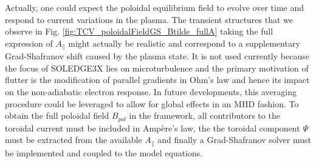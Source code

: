 Actually, one could expect the poloidal equilibrium field to evolve over time and respond to current variations in the plasma. The transient structures that we observe in Fig. \ref{fig:TCV_poloidalFieldGS_Btilde_fullA} taking the full expression of $A_\parallel$ might actually be realistic and correspond to a supplementary Grad-Shafranov shift caused by the plasma state. It is not used currently because the focus of SOLEDGE3X lies on microturbulence and the primary motivation of flutter is the modification of parallel gradients in Ohm's law and hence its impact on the non-adiabatic electron response. In future developments, this averaging procedure could be leveraged to allow for global effects in an MHD fashion. To obtain the full poloidal field $B_{pol}$ in the framework, all contributors to the toroidal current must be included in Ampère's law, the the toroidal component $\Psi$ must be extracted from the available $A_\parallel$ and finally a Grad-Shafranov solver must be implemented and coupled to the model equations.


%
%
%
%
%
%
%
%
%
%
%









